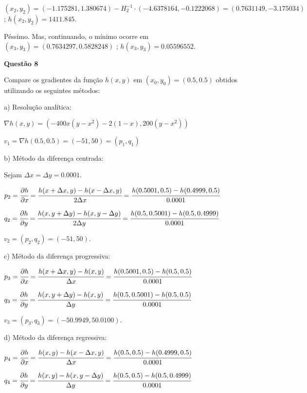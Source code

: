 \documentclass{rbfin}
\begin{document}
$(x_2, y_2) = (-1.175281, 1.380674) - H_2^{-1} \cdot (-4.6378164,-0.1222068) = (0.7631149, -3.175034)$ ; $h(x_2, y_2) = 1411.845$.

Péssimo. Mas, continuando, o mínimo ocorre em $(x_3, y_3) = (0.7634297, 0.5828248)$ ; $h(x_3, y_3) = 0.05596552$.

\singlespacing

\newpage

\large

\textbf{Questão 8}

\normalsize

\vspace{6mm}

\doublespacing

Compare os gradientes da função $h(x, y)$ em $(x_0, y_0) = (0.5, 0.5)$ obtidos utilizando os seguintes métodos:

a) Resolução analítica:

$\nabla h(x,y) = (-400x(y - x^2) - 2(1 - x), 200(y - x^2))$

$v_1 = \nabla h(0.5, 0.5) = (-51,50) = (p_1, q_1)$

b) Método da diferença centrada:

Sejam $\Delta x = \Delta y = 0.0001$.

$p_2 = \cfrac{\partial h}{\partial x} = \cfrac{h(x + \Delta x,y) - h(x - \Delta x,y)}{2\Delta x} = \cfrac{h(0.5001,0.5) - h(0.4999,0.5)}{0.0001}$

$q_2 = \cfrac{\partial h}{\partial y} = \cfrac{h(x,y + \Delta y) - h(x,y - \Delta y)}{2\Delta y} = \cfrac{h(0.5,0.5001) - h(0.5,0.4999)}{0.0001}$

$v_2 = (p_2, q_2) = (-51,50)$.

c) Método da diferença progressiva:

$p_3 = \cfrac{\partial h}{\partial x} = \cfrac{h(x + \Delta x,y) - h(x,y)}{\Delta x} = \cfrac{h(0.5001,0.5) - h(0.5,0.5)}{0.0001}$

$q_3 = \cfrac{\partial h}{\partial y} = \cfrac{h(x,y + \Delta y) - h(x,y)}{\Delta y} = \cfrac{h(0.5,0.5001) - h(0.5,0.5)}{0.0001}$

$v_3 = (p_3, q_3) = (-50.9949, 50.0100)$.

d) Método da diferença regressiva:

$p_4 = \cfrac{\partial h}{\partial x} = \cfrac{h(x,y) - h(x - \Delta x,y)}{\Delta x} = \cfrac{h(0.5,0.5) - h(0.4999,0.5)}{0.0001}$

$q_4 = \cfrac{\partial h}{\partial y} = \cfrac{h(x,y) - h(x,y - \Delta y)}{\Delta y} = \cfrac{h(0.5,0.5) - h(0.5,0.4999)}{0.0001}$
\end{document}
